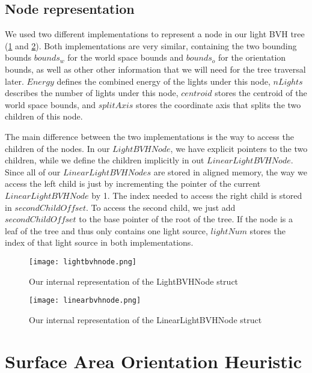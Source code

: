 \subsection{Node representation}

We used two different implementations to represent a node in our light BVH tree (\ref{fig:lightbvhnode} and \ref{fig:linearlightbvhnode}). Both implementations are very similar, containing the two bounding bounds $bounds_w$ for the world space bounds and $bounds_o$ for the orientation bounds, as well as other other information that we will need for the tree traversal later. $Energy$ defines the combined energy of the lights under this node, $nLights$ describes the number of lights under this node, $centroid$ stores the centroid of the world space bounds, and $splitAxis$ stores the coordinate axis that splits the two children of this node. 

The main difference between the two implementations is the way to access the children of the nodes. In our $LightBVHNode$, we have explicit pointers to the two children, while we define the children implicitly in out $LinearLightBVHNode$. Since all of our $LinearLightBVHNodes$ are stored in aligned memory, the way we access the left child is just by incrementing the pointer of the current $LinearLightBVHNode$ by 1. The index needed to access the right child is stored in $secondChildOffset$. To access the second child, we just add $secondChildOffset$ to the base pointer of the root of the tree. If the node is a leaf of the tree and thus only contains one light source, $lightNum$ stores the index of that light source in both implementations.

\begin{figure}
	\begin{center}
		\texttt{[image: lightbvhnode.png]}
		\caption{Our internal representation of the LightBVHNode struct}
		\label{fig:lightbvhnode}
	\end{center}
\end{figure}

\begin{figure}
	\begin{center}
		\texttt{[image: linearbvhnode.png]}
		\caption{Our internal representation of the LinearLightBVHNode struct}
		\label{fig:linearlightbvhnode}
	\end{center}
\end{figure}

\section{Surface Area Orientation Heuristic}
\label{sec:saoh}

